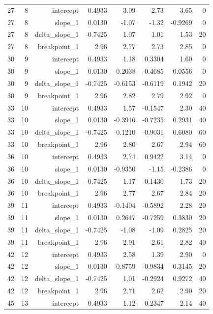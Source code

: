 {\begin{longtable}{lrrrrrrr}
  27 & 8 & intercept & 0.4933 & 3.09 & 2.73 & 3.65 & 0 \\
  27 & 8 & slope\_1 & 0.0130 & -1.07 & -1.32 & -0.9269 & 0 \\
  27 & 8 & delta\_slope\_1 & -0.7425 & 1.07 & 1.01 & 1.53 & 20 \\
  27 & 8 & breakpoint\_1 & 2.96 & 2.77 & 2.73 & 2.85 & 0 \\
  30 & 9 & intercept & 0.4933 & 1.18 & 0.3304 & 1.60 & 0 \\
  30 & 9 & slope\_1 & 0.0130 & -0.2038 & -0.4685 & 0.0556 & 0 \\
  30 & 9 & delta\_slope\_1 & -0.7425 & -0.6153 & -0.6119 & 0.1942 & 20 \\
  30 & 9 & breakpoint\_1 & 2.96 & 2.82 & 2.79 & 2.92 & 0 \\
  33 & 10 & intercept & 0.4933 & 1.57 & -0.1547 & 2.30 & 40 \\
  33 & 10 & slope\_1 & 0.0130 & -0.3916 & -0.7235 & 0.2931 & 40 \\
  33 & 10 & delta\_slope\_1 & -0.7425 & -0.1210 & -0.9031 & 0.6080 & 60 \\
  33 & 10 & breakpoint\_1 & 2.96 & 2.80 & 2.67 & 2.94 & 60 \\
  36 & 10 & intercept & 0.4933 & 2.74 & 0.9422 & 3.14 & 0 \\
  36 & 10 & slope\_1 & 0.0130 & -0.9350 & -1.15 & -0.2386 & 0 \\
  36 & 10 & delta\_slope\_1 & -0.7425 & 1.17 & 0.1430 & 1.73 & 20 \\
  36 & 10 & breakpoint\_1 & 2.96 & 2.77 & 2.67 & 2.84 & 20 \\
  39 & 11 & intercept & 0.4933 & -0.1404 & -0.5892 & 2.28 & 20 \\
  39 & 11 & slope\_1 & 0.0130 & 0.2647 & -0.7259 & 0.3830 & 20 \\
  39 & 11 & delta\_slope\_1 & -0.7425 & -1.08 & -1.09 & 0.2825 & 20 \\
  39 & 11 & breakpoint\_1 & 2.96 & 2.91 & 2.61 & 2.82 & 40 \\
  42 & 12 & intercept & 0.4933 & 2.58 & 1.39 & 2.90 & 0 \\
  42 & 12 & slope\_1 & 0.0130 & -0.8759 & -0.9834 & -0.3145 & 20 \\
  42 & 12 & delta\_slope\_1 & -0.7425 & 1.01 & -0.2924 & 0.9272 & 40 \\
  42 & 12 & breakpoint\_1 & 2.96 & 2.71 & 2.62 & 2.90 & 20 \\
  45 & 13 & intercept & 0.4933 & 1.12 & 0.2347 & 2.14 & 40 \\

\end{longtable}}
